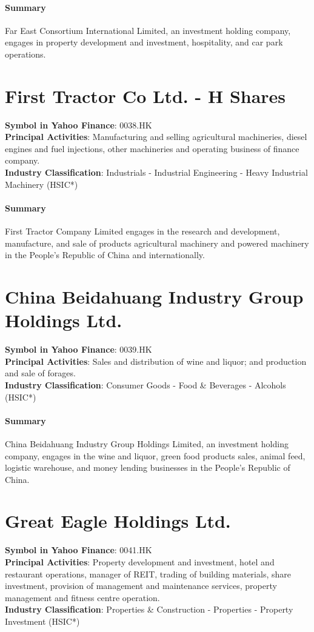 \paragraph{Summary}
Far East Consortium International Limited, an investment holding company, engages in property development and investment, hospitality, and car park operations.


\section{First Tractor Co Ltd. - H Shares}
\textbf{Symbol in Yahoo Finance}: 0038.HK\\
\textbf{Principal Activities}: Manufacturing and selling agricultural machineries, diesel engines and fuel injections, other machineries and operating business of finance company.\\
\textbf{Industry Classification}: Industrials - Industrial Engineering - Heavy Industrial Machinery (HSIC*)
\paragraph{Summary}
First Tractor Company Limited engages in the research and development, manufacture, and sale of products agricultural machinery and powered machinery in the People's Republic of China and internationally.


\section{China Beidahuang Industry Group Holdings Ltd.}
\textbf{Symbol in Yahoo Finance}: 0039.HK\\
\textbf{Principal Activities}: Sales and distribution of wine and liquor; and production and sale of forages.\\
\textbf{Industry Classification}: Consumer Goods - Food \& Beverages - Alcohols (HSIC*)
\paragraph{Summary}
China Beidahuang Industry Group Holdings Limited, an investment holding company, engages in the wine and liquor, green food products sales, animal feed, logistic warehouse, and money lending businesses in the People's Republic of China.


\section{Great Eagle Holdings Ltd.}
\textbf{Symbol in Yahoo Finance}: 0041.HK\\
\textbf{Principal Activities}: Property development and investment, hotel and restaurant operations, manager of REIT, trading of building materials, share investment, provision of management and maintenance services, property management and fitness centre operation.\\
\textbf{Industry Classification}: Properties \& Construction - Properties - Property Investment (HSIC*)
